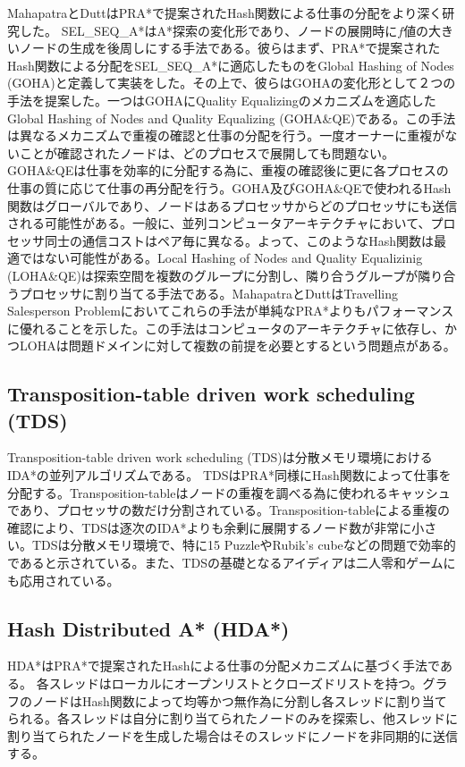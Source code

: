\documentclass{jsarticle}
\begin{document}
MahapatraとDuttはPRA*で提案されたHash関数による仕事の分配をより深く研究した\cite{mahapatra1997scalable}。
SEL\_SEQ\_A*はA*探索の変化形であり、ノードの展開時に$f$値の大きいノードの生成を後周しにする手法である。彼らはまず、PRA*で提案されたHash関数による分配をSEL\_SEQ\_A*に適応したものをGlobal Hashing of Nodes (GOHA)と定義して実装をした。その上で、彼らはGOHAの変化形として２つの手法を提案した。一つはGOHAにQuality Equalizingのメカニズムを適応したGlobal Hashing of Nodes and Quality Equalizing (GOHA\&QE)である。この手法は異なるメカニズムで重複の確認と仕事の分配を行う。一度オーナーに重複がないことが確認されたノードは、どのプロセスで展開しても問題ない。GOHA\&QEは仕事を効率的に分配する為に、重複の確認後に更に各プロセスの仕事の質に応じて仕事の再分配を行う。GOHA及びGOHA\&QEで使われるHash関数はグローバルであり、ノードはあるプロセッサからどのプロセッサにも送信される可能性がある。一般に、並列コンピュータアーキテクチャにおいて、プロセッサ同士の通信コストはペア毎に異なる。よって、このようなHash関数は最適ではない可能性がある。Local Hashing of Nodes and Quality Equalizinig (LOHA\&QE)は探索空間を複数のグループに分割し、隣り合うグループが隣り合うプロセッサに割り当てる手法である。MahapatraとDuttはTravelling Salesperson Problemにおいてこれらの手法が単純なPRA*よりもパフォーマンスに優れることを示した。この手法はコンピュータのアーキテクチャに依存し、かつLOHAは問題ドメインに対して複数の前提を必要とするという問題点がある。

\subsection{Transposition-table driven work scheduling (TDS)}
Transposition-table driven work scheduling (TDS)は分散メモリ環境におけるIDA*の並列アルゴリズムである\cite{romein1999transposition}。
TDSはPRA*同様にHash関数によって仕事を分配する。Transposition-tableはノードの重複を調べる為に使われるキャッシュであり、プロセッサの数だけ分割されている。Transposition-tableによる重複の確認により、TDSは逐次のIDA*よりも余剰に展開するノード数が非常に小さい。TDSは分散メモリ環境で、特に15 PuzzleやRubik's cubeなどの問題で効率的であると示されている。また、TDSの基礎となるアイディアは二人零和ゲームにも応用されている。


\subsection{Hash Distributed A* (HDA*)}
HDA*はPRA*で提案されたHashによる仕事の分配メカニズムに基づく手法である。
各スレッドはローカルにオープンリストとクローズドリストを持つ。グラフのノードはHash関数によって均等かつ無作為に分割し各スレッドに割り当てられる。各スレッドは自分に割り当てられたノードのみを探索し、他スレッドに割り当てられたノードを生成した場合はそのスレッドにノードを非同期的に送信する。
\end{document}
